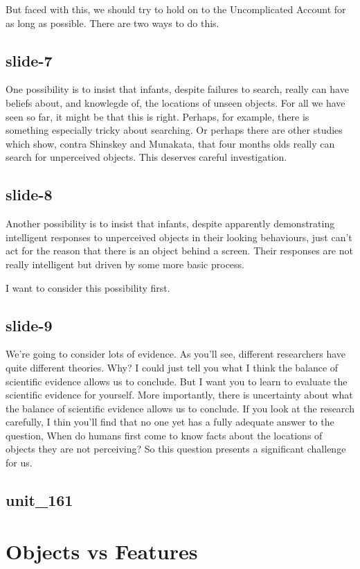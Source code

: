 \documentclass[12pt,\papersize]{extarticle}
\begin{document}
But faced with this, we should try to hold on to the Uncomplicated Account
for as long as possible.
There are two ways to do this.
 
\subsection{slide-7}
One possibility is to insist that infants, despite failures to search,
really can have beliefs about, and knowlegde of, the locations of unseen objects.
For all we have seen so far, it might be that this is right.
Perhaps, for example, there is something especially tricky about searching.
Or perhaps there are other studies which show, contra Shinskey and Munakata,
that four months olds really can search for unperceived objects.
This deserves careful investigation.
 
\subsection{slide-8}
Another possibility is to insist that infants, despite apparently demonstrating
intelligent responses to unperceived objects in their looking behaviours,
just can’t act for the reason that there is an object behind a screen.
Their responses are not really intelligent but driven by some more basic process.
 
I want to consider this possibility first.
 
\subsection{slide-9}
We’re going to consider lots of evidence.
As you’ll see, different researchers have quite different theories.
Why?
I could just tell you what I think the balance of scientific evidence
allows us to conclude.
But I want you to learn to evaluate the scientific evidence for yourself.
More importantly, there is uncertainty about what the 
balance of scientific evidence allows us to conclude.
If you look at the research carefully, I thin you’ll find that
no one yet has a fully adequate answer to the question,
When do humans first come to know facts about the locations of objects they
are not perceiving?
So this question presents a significant challenge for us.
 
\subsection{unit\_161}
 
 
\section{Objects vs Features}
 
\end{document}
